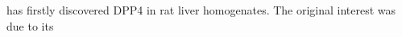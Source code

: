 \citet{Hopsu-Havu1966} has firstly discovered DPP4 in rat liver homogenates. The original interest was due to its 